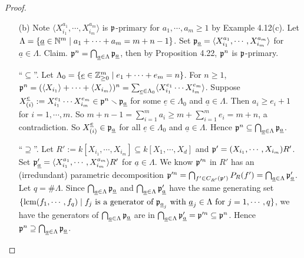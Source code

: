 \begin{proof}
    \begin{enumerate}
        \item[(b)]
            Note $\langle X_{i_1}^{a_1},\cdots,X_{i_m}^{a_m} \rangle$ is $\mathfrak{p}$-primary for $a_1,\cdots,a_m \geq 1$ by Example 4.12(c). Let $\Lambda = \{\underline a \in \mathbb{N}^{m} \mid a_1 + \cdots + a_m = m+n-1\}$. Set $\mathfrak{p}_{\underline a} = \langle X_{i_1}^{a_1},\cdots,X_{i_m}^{a_m} \rangle$ for $\underline a \in \Lambda$. Claim. $\mathfrak{p}^{n} = \bigcap_{\underline a \in \Lambda} \mathfrak{p}_{\underline a}$, then by Proposition 4.22, $\mathfrak{p}^{n}$ is $\mathfrak{p}$-primary. \par
            ``$\subseteq$''. Let $\Lambda_0 = \{\underline e \in \mathbb{Z}_{\geq 0}^{m} \mid e_1 + \cdots + e_m = n\}$. For $n \geq 1$, $\mathfrak{p}^{n} = (\langle X_{i_1} \rangle + \cdots + \langle X_{i_m} \rangle)^{n} = \sum_{\underline e \in \Lambda_0} \langle X_{i_1}^{e_1} \cdots X_{i_m}^{e_m} \rangle$. Suppose $X_{(i)}^{\underline e} := X_{i_1}^{e_1} \cdots X_{i_m}^{e_m} \in \mathfrak{p}^{n} \smallsetminus \mathfrak{p}_{\underline a}$ for some $\underline e \in \Lambda_0$ and $\underline a \in \Lambda$. Then $a_i \geq e_i+1$ for $i = 1,\cdots,m$. So $m+n-1 = \sum_{i=1}^{m}a_i \geq m + \sum_{i=1}^{m}e_i = m+n$, a contradiction. So $X^{\underline e}_{(i)} \in \mathfrak{p}_{\underline a}$ for all $\underline e \in \Lambda_0$ and $\underline a \in \Lambda$. Hence $\mathfrak{p}^{n} \subseteq \bigcap_{\underline a \in \Lambda} \mathfrak{p}_{\underline a}$. \par 
        ``$\supseteq$''. Let $R' := k[X_{i_1},\cdots,X_{i_m}] \subseteq k[X_1,\cdots,X_d]$ and $\mathfrak{p}' = (X_{i_1},\cdots,X_{i_m})R'$. Set $\mathfrak{p}'_{\underline a} = \langle X_{i_1}^{a_1},\cdots,X_{i_m}^{a_m} \rangle R'$ for $\underline a \in \Lambda$. We know $\mathfrak{p}'^{n}$ in $R'$ has an (irredundant) parametric decomposition $\mathfrak{p}'^{n} = \bigcap_{f' \in C_{R'}(\mathfrak{p}')} P_R(f') = \bigcap_{\underline a \in \Lambda} \mathfrak{p}'_{\underline a}$. Let $q = \# \Lambda$. Since $\bigcap_{\underline a \in \Lambda} \mathfrak{p}_{\underline a}$ and $\bigcap_{\underline a \in \Lambda} \mathfrak{p}'_{\underline a}$ have the same generating set $\{\operatorname{lcm}(f_1,\cdots,f_q) \mid f_j \text{ is a generator of $\mathfrak{p}_{\underline a_j}$ with $\underline a_j \in \Lambda$ for $j=1,\cdots,q$}\}$, we have the generators of $\bigcap_{\underline a \in \Lambda} \mathfrak{p}_{\underline a}$ are in $\bigcap_{\underline a \in \Lambda} \mathfrak{p}_{\underline a}' = \mathfrak{p}'^{n} \subseteq \mathfrak{p}^{n}$. Hence $\mathfrak{p}^{n} \supseteq \bigcap_{\underline a \in \Lambda} \mathfrak{p}_{\underline a}$. \qedhere
    \end{enumerate}
\end{proof}


